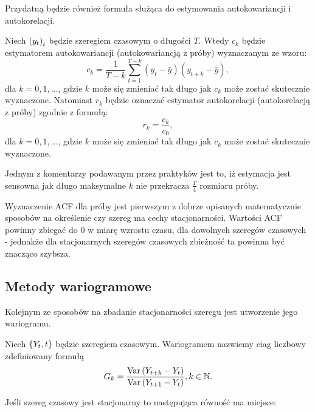 \documentclass[10pt,a4paper]{book}
\begin{document}
Przydatną będzie również formuła służąca do estymowania autokowariancji i autokorelacji.

\begin{definition}
Niech $\left( {y_t} \right)_{t}^{}$ będzie szeregiem czasowym o długości $T$. Wtedy $c_k$ będzie estymatorem autokowariancji (autokowariancją z próby) wyznaczanym ze wzoru:
$$
c_k = \frac{1}{T-k}	 \sum_{t=1}^{T-k} (y_t - \bar{y}) (y_{t+k} - \bar{y}),
$$
dla $k = 0,1, \ldots$, gdzie $k$ może się zmieniać tak długo jak $c_k$ może zostać skutecznie wyznaczone.
Natomiast $r_k$ będzie oznaczać estymator autokorelacji (autokorelacją z próby) zgodnie z formułą:
$$
r_k = \frac{c_k}{c_0},
$$
dla $k = 0,1, \ldots$, gdzie $k$ może się zmieniać tak długo jak $c_k$ może zostać skutecznie wyznaczone.
\end{definition}

Jednym z komentarzy podawanym przez praktyków jest to, iż estymacja jest sensowna jak długo maksymalne $k$ nie przekracza $\frac{T}{4}$ rozmiaru próby.

\begin{remark}
Wyznaczenie ACF dla próby jest pierwszym z dobrze opisanych matematycznie sposobów na określenie czy szereg ma cechy stacjonarności. Wartości ACF powinny zbiegać do $0$ w miarę wzrostu czasu, dla dowolnych szeregów czasowych - jednakże dla stacjonarnych szeregów czasowych zbieżność ta powinna być znacząco szybsza.
\end{remark}

\subsection{Metody wariogramowe}
Kolejnym ze sposobów na zbadanie stacjonarności szeregu jest utworzenie jego wariogramu. 

\begin{definition}[Wariogram]
Niech $\left\lbrace {{Y_t}, {t}} \right\rbrace$ będzie szeregiem czasowym. Wariogramem nazwiemy ciag liczbowy zdefiniowany formułą
$$
G_k = \frac{\operatorname{Var} \left( {Y_{t+k} - Y_{t}} \right)}{ \operatorname{Var} \left( {Y_{t+1} - Y_t } \right)}, k \in \mathbb{N}.
$$
\end{definition}

Jeśli szereg czasowy jest stacjonarny to następująca równość ma miejsce:
\end{document}
